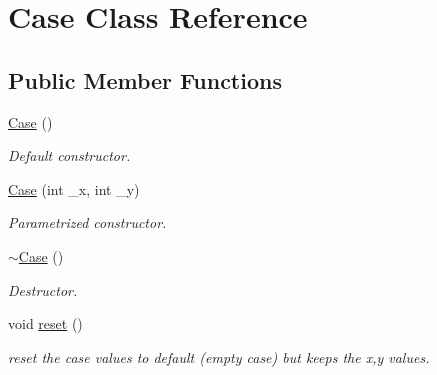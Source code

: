\hypertarget{class_case}{}\section{Case Class Reference}
\label{class_case}
\subsection*{Public Member Functions}
\begin{DoxyCompactItemize}
\item 
\mbox{\label{class_case_a14237e17aab1829965adab76b747db6c}} 
\hyperlink{class_case_a14237e17aab1829965adab76b747db6c}{Case} ()
\begin{DoxyCompactList}\small\item\em Default constructor. \end{DoxyCompactList}\item 
\hyperlink{class_case_aa0e4be50dd7f978fc2454222d0915203}{Case} (int \+\_\+x, int \+\_\+y)
\begin{DoxyCompactList}\small\item\em Parametrized constructor. \end{DoxyCompactList}\item 
\mbox{\label{class_case_ab004564aae3e15db0c7fd5dde0b4c379}} 
\hyperlink{class_case_ab004564aae3e15db0c7fd5dde0b4c379}{$\sim$\+Case} ()
\begin{DoxyCompactList}\small\item\em Destructor. \end{DoxyCompactList}\item 
\mbox{\label{class_case_a08c0a3fbf2a9ed94c9d169a4845989aa}} 
void \hyperlink{class_case_a08c0a3fbf2a9ed94c9d169a4845989aa}{reset} ()
\begin{DoxyCompactList}\small\item\em reset the case values to default (empty case) but keeps the x,y values. \end{DoxyCompactList}\end{DoxyCompactItemize}
